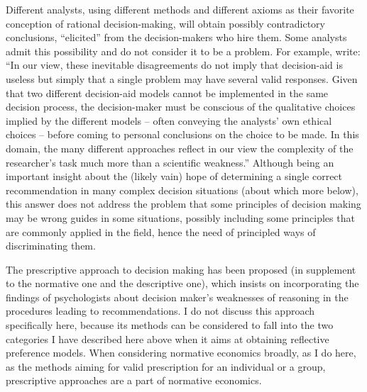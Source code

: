 \documentclass[version=last, pagesize, twoside=off, bibliography=totoc, DIV=calc, fontsize=12pt, a4paper, french, english]{scrartcl}
\begin{document}
Different analysts, using different methods and different axioms as their favorite conception of rational decision-making, will obtain possibly contradictory conclusions, “elicited” from the decision-makers who hire them. Some analysts admit this possibility and do not consider it to be a problem.
For example, \citet[p.\ 214]{roy_comparison_1995} write: “In our view, these inevitable disagreements do not imply that decision-aid is useless but simply that a single problem may have several valid responses. Given that two different decision-aid models cannot be implemented in the same decision process, the decision-maker must be conscious of the qualitative choices implied by the different models – often conveying the analysts’ own ethical choices – before coming to personal conclusions on the choice to be made. In this domain, the many different approaches reflect in our view the complexity of the researcher's task much more than a scientific weakness.”
Although being an important insight about the (likely vain) hope of determining a single correct recommendation in many complex decision situations (about which more below), this answer does not address the problem that some principles of decision making may be wrong guides in some situations, possibly including some principles that are commonly applied in the field, hence the need of principled ways of discriminating them.

The prescriptive approach to decision making \citep{bell_decision_1988} has been proposed (in supplement to the normative one and the descriptive one), which insists on incorporating the findings of psychologists about decision maker’s weaknesses of reasoning in the procedures leading to recommendations. I do not discuss this approach specifically here, because its methods can be considered to fall into the two categories I have described here above when it aims at obtaining reflective preference models. When considering normative economics broadly, as I do here, as the methods aiming for valid prescription for an individual or a group, prescriptive approaches are a part of normative economics.

\end{document}
